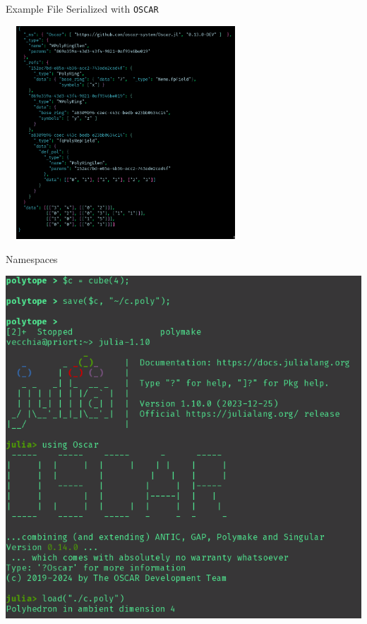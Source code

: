 \documentclass[9pt]{beamer}
\newcommand\oscar{\texttt{OSCAR}\xspace}
\theoremstyle{definition}
\begin{document}

\begin{frame}[fragile]{Example File Serialized with \oscar}
  \begin{center}
    \includegraphics[height=8cm, width=9cm]{images/polynomial-example}
  \end{center}
\end{frame}



\begin{frame}[fragile]{Namespaces}
  \begin{center}
    \includegraphics[height=.9\textheight]{images/pm-oscar}
  \end{center}
\end{frame}
\end{document}
